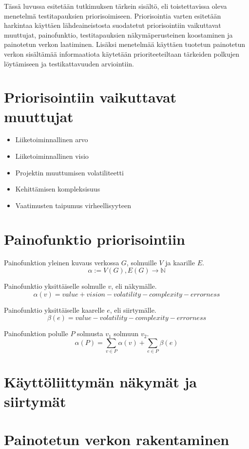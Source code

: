 Tässä luvussa esitetään tutkimuksen tärkein sisältö, eli toistettavissa oleva menetelmä testitapauksien priorisoimiseen.
Priorisointia varten esitetään harkintaa käyttäen lähdeaineistosta suodatetut priorisointiin vaikuttavat muuttujat, painofunktio, testitapauksien näkymäperusteinen koostaminen ja painotetun verkon laatiminen.
Lisäksi menetelmää käyttäen tuotetun painotetun verkon sisältämää informaatiota käytetään prioriteeteiltaan tärkeiden polkujen löytämiseen ja testikattavuuden arviointiin.

\section{Priorisointiin vaikuttavat muuttujat}

\begin{itemize}
  \item Liiketoiminnallinen arvo
  \item Liiketoiminnallinen visio
  \item Projektin muuttumisen volatiliteetti
  \item Kehittämisen kompleksisuus
  \item Vaatimusten taipumus virheellisyyteen
\end{itemize}

\section{Painofunktio priorisointiin}

Painofunktion yleinen kuvaus verkossa \(G\), solmuille \(V\) ja kaarille \(E\).
\[\alpha := V(G), E(G) \rightarrow \mathbb{N}\]

Painofunktio yksittäiselle solmulle \(v\), eli näkymälle.
\[\alpha(v) = value + vision - volatility - complexity - errorness\]

Painofunktio yksittäiselle kaarelle \(e\), eli siirtymälle.
\[\beta(e) = value - volatility - complexity - errorness\]

Painofunktion polulle \(P\) solmusta \(v_1\) solmuun \(v_2\).
\[\alpha(P) = \sum_{v \in P} \alpha(v) + \sum_{e \in P} \beta(e)\]

\section{Käyttöliittymän näkymät ja siirtymät}

\section{Painotetun verkon rakentaminen}

